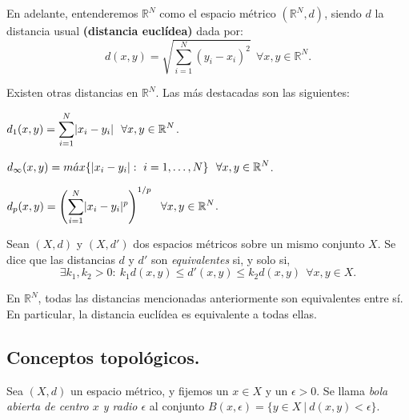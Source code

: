 \begin{nota}
En adelante, entenderemos $\mathbb{R}^N$ como el espacio métrico $(\mathbb{R}^N,d)$, siendo $d$ la distancia usual \textbf{(distancia euclídea)} dada por: $$d(x,y) = \sqrt{\sum_{i=1}^N (y_i - x_i)^2}\ \ \forall x,y\in \mathbb{R}^N.$$

Existen otras distancias en $\mathbb{R}^N$. Las más destacadas son las siguientes:

\begin{nlist}
\item $\displaystyle d_1(x,y) = \sum_{i=1}^N \lvert x_i - y_i\rvert\ \ \forall x,y \in \mathbb{R}^N$.

\item $\displaystyle d_{\infty}(x,y) = m\acute{a}x \{\lvert x_i - y_i\rvert: \ i=1,\dots,N \}\ \ \forall x,y\in \mathbb{R}^N$.

\item $\displaystyle d_p(x,y) = \left( \sum_{i=1}^N \lvert x_i - y_i\rvert^p \right)^{1/p}\ \ \forall x,y\in \mathbb{R}^N$.\\
\end{nlist}

\end{nota}



\begin{ndef}
Sean $(X,d)$ y $(X,d')$ dos espacios métricos sobre un mismo conjunto $X$. Se dice que las distancias $d$ y $d'$ son \textit{equivalentes} si, y solo si, $$\exists k_1,k_2 > 0 :\ k_1d(x,y)\le d'(x,y) \le k_2d(x,y)\ \ \forall x,y\in X.$$
\end{ndef}



\begin{nprop}
En $\mathbb{R}^N$, todas las distancias mencionadas anteriormente son equivalentes entre sí. En particular, la distancia euclídea es equivalente a todas ellas.
\end{nprop}


\subsection{Conceptos topológicos.}

\begin{ndef}
Sea $(X,d)$ un espacio métrico, y fijemos un $x\in X$ y un $\epsilon > 0$. Se llama \emph{bola abierta de centro $x$ y radio $\epsilon$} al conjunto $B(x,\epsilon) = \{ y\in X \ | \ d(x,y)<\epsilon\}$.
\end{ndef}



